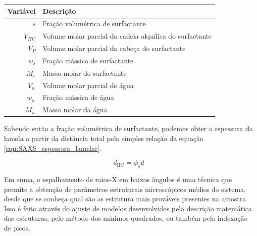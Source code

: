 	
		\begin{table}[H]
			{\begin{tabular}{r l}
				\toprule
				           Variável & Descrição                                               \\ \midrule
				              \(s\) & Fração volumétrica de surfactante                       \\
				\(V_{\textit{HC}}\) & Volume molar parcial da cadeia alquílica do surfactante \\
				          \(V_{P}\) & Volume molar parcial da cabeça do surfactante           \\
				          \(w_{s}\) & Fração mássica de surfactante                           \\
				          \(M_{s}\) & Massa molar do surfactante                              \\ \midrule
				          \(V_{w}\) & Volume molar parcial de água                            \\
				          \(w_{w}\) & Fração mássica de água                                  \\
				          \(M_{w}\) & Massa molar da água                                     \\ \bottomrule
			\end{tabular}
			}%
			{}%
		\end{table}

		
		Sabendo então a fração volumétrica de surfactante, podemos obter a espessura da lamela a partir da distância total pela simples relação da equação \ref{eqn:SAXS_espessura_lamelar}.
		
		\begin{equation} \label{eqn:SAXS_espessura_lamelar}
			d_{\text{HC}} = \phi_s d
		\end{equation}
		
		Em suma, o espalhamento de raios-X em baixos ângulos é uma técnica que permite a obtenção de parâmetros estruturais microscópicos médios do sistema, desde que se conheça qual são as estrutura mais prováveis presentes na amostra. Isso é feito através do ajuste de modelos desenvolvidos pela descrição matemática das estruturas, pelo método dos mínimos quadrados, ou também pela indexação de picos.
		
